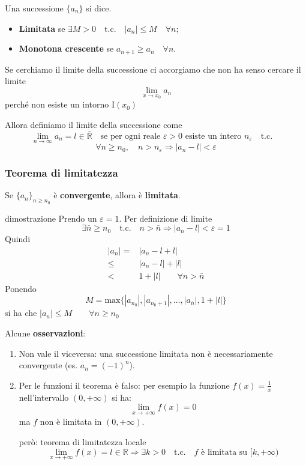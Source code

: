 \documentclass[x11names]{article}
\begin{document}
	Una successione $\{a_n\}$ si dice.
	\begin{itemize}
		\item \textbf{Limitata} se $\exists M>0 \quad \text{t.c.} \quad |a_n| \leq M \quad \forall n$;
		\item \textbf{Monotona crescente} se $a_{n+1} \geq  a_n \quad \forall n$.
	\end{itemize} 
	
	Se cerchiamo il limite della successione ci accorgiamo che non ha senso cercare il limite
	\[
	\lim_{x \to x_0}a_n
	\]
	perché non esiste un intorno I$(x_0)$
	
	Allora definiamo il limite della successione come
	\[
	\lim_{n \to \infty}a_n = l \in \bar{\mathbb{R}} \quad \text{se per ogni reale } \varepsilon > 0 \text{ esiste un intero } n_\varepsilon \quad \text{t.c.} \quad 
	\]
	\[
	\forall n \geq n_0, \quad n > n_\varepsilon \Longrightarrow |a_n - l| < \varepsilon
	\]
	\begin{center}
		\colorbox{myred}{\begin{minipage}{5.75in}
				\begin{redes}{}
					\subsubsection{Teorema di limitatezza}
					Se $\{a_n\}_{n\geq n_0}$ è \textbf{convergente}, allora è \textbf{limitata}.
				\end{redes}
		\end{minipage}}        
	\end{center}
	\begin{es}{dimostrazione}
		Prendo un $\varepsilon = 1$. Per definizione di limite
		\[
		\exists \bar{n} \geq n_0 \quad \text{t.c.} \quad n > \bar{n} \Longrightarrow |a_n - l| < \varepsilon = 1
		\]
		Quindi
		\begin{align*}
			|a_n| =& |a_n -l +l| \\
			 \leq& |a_n - l| + |l| \\
			<&  1 + |l| \qquad \forall n > \bar{n}
		\end{align*}
		Ponendo
		\[
		M = \text{max}\{|a_{n_0}|, |a_{n_0 +1}|, \dots, |a_{\bar{n}}|, 1 + |l|\}
		\]
		si ha che $|a_n| \leq M \qquad \forall n \geq n_0$
	\end{es}
	Alcune \textbf{osservazioni}:
	\begin{enumerate}
		\item Non vale il viceversa: una successione limitata non è necessariamente convergente (es. $a_n = (-1)^n$).
		\item Per le funzioni il teorema è falso: per esempio la funzione $f(x) = \frac{1}{x}$ nell'intervallo $(0,+\infty)$ si ha:
		\[
		\lim_{x \to + \infty}f(x) = 0
		\]
		ma $f$ non è limitata in $(0,+\infty)$.
		\begin{es}{però: teorema di limitatezza locale}
			\[
			\lim_{x \to +\infty}f(x) = l \in \mathbb{R} \Longrightarrow \exists k>0 \quad \text{t.c.} \quad f \text{ è limitata su } [k,+\infty)
			\]
		\end{es}
	\end{enumerate}
	
\end{document}
